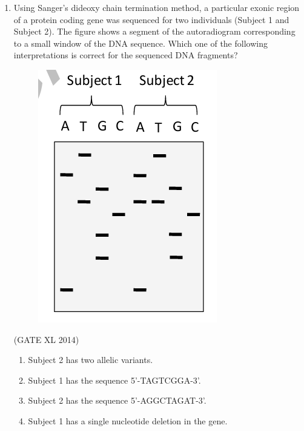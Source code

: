 \documentclass[journal,12pt,onecolumn]{IEEEtran}
\theoremstyle{remark}
\begin{document}
\begin{enumerate}
\item Using Sanger’s dideoxy chain termination method, a particular exonic region of a protein coding gene was sequenced for two individuals (Subject 1 and Subject 2). The figure shows a segment of the autoradiogram corresponding to a small window of the DNA sequence. Which one of the following interpretations is correct for the sequenced DNA fragments?
\begin{figure}[H]
    \centering
    \includegraphics[width=0.3\columnwidth]{fig27.png}
    \caption{}
    \label{fig:placeholder}
\end{figure}
\hfill (GATE XL 2014)\\
\begin{enumerate}
\item Subject 2 has two allelic variants.
\item Subject 1 has the sequence 5'-TAGTCGGA-3'.
\item Subject 2 has the sequence 5'-AGGCTAGAT-3'.
\item Subject 1 has a single nucleotide deletion in the gene.
\end{enumerate}
\vspace{0.5cm}


\end{enumerate}
\end{document}
